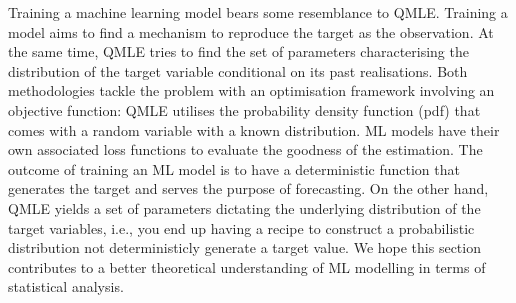 Training a machine learning model bears some resemblance to QMLE. Training a model aims to find a mechanism to reproduce the target as the observation. At the same time, QMLE tries to find the set of parameters characterising the distribution of the target variable conditional on its past realisations. Both methodologies tackle the problem with an optimisation framework involving an objective function: QMLE utilises the probability density function (pdf) that comes with a random variable with a known distribution. ML models have their own associated loss functions to evaluate the goodness of the estimation. The outcome of training an ML model is to have a deterministic function that generates the target and serves the purpose of forecasting. On the other hand, QMLE yields a set of parameters dictating the underlying distribution of the target variables, i.e., you end up having a recipe to construct a probabilistic distribution not deterministicly generate a target value. We hope this section contributes to a better theoretical understanding of ML modelling in terms of statistical analysis.

